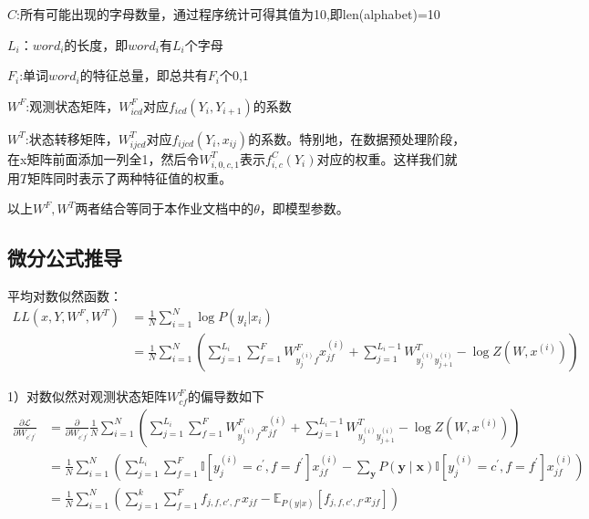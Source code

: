 \documentclass[a4paper,UTF8]{article}
\numberwithin{equation}{section}
\begin{document}
$C$:所有可能出现的字母数量，通过程序统计可得其值为10,即len(alphabet)=10

$L_{i}$：$word_{i}$的长度，即$word_{i}$有$L_i$个字母

$F_i$:单词$word_i$的特征总量，即总共有$F_i$个0,1

$W^F$:观测状态矩阵，$W^F_{icd}$对应$f_{icd}(Y_i,Y_{i+1})$的系数

$W^T$:状态转移矩阵，$W^T_{ijcd}$对应$f_{ijcd}(Y_i,x_{ij})$的系数。特别地，在数据预处理阶段，在x矩阵前面添加一列全1，然后令$W^T_{i,0,c,1}$表示$f^C_{i,c}(Y_i)$对应的权重。这样我们就用$T$矩阵同时表示了两种特征值的权重。

以上$W^F,W^T$两者结合等同于本作业文档中的$\theta$，即模型参数。

\subsection{微分公式推导}
平均对数似然函数：
$$
\begin{aligned}
LL(x,Y,W^F,W^T)&=\frac 1 N \sum\limits_{i=1}^N \log P(y_i|x_i)\\
&=\frac{1}{N} \sum_{i=1}^{N}\left(\sum_{j=1}^{L_{i}} \sum_{f=1}^{F} W_{y_{j}^{(i)} f}^{F} x_{j f}^{(i)}+\sum_{j=1}^{L_{i}-1} W_{y_{j}^{(i)} y_{j+1}^{(i)}}^{T}-\log Z\left(W, x^{(i)}\right)\right)
\end{aligned}
$$

1）对数似然对观测状态矩阵$W_{cf}^{F}$的偏导数如下
$$
\begin{aligned}
\frac{\partial \mathcal{L}}{\partial W_{c^{\prime} f^{\prime}}}
&=\frac{\partial}{\partial W_{c^{\prime} f^{\prime}}} \frac{1}{N} \sum_{i=1}^{N}\left(\sum_{j=1}^{L_{i}} \sum_{f=1}^{F} W_{y_{j}^{(i)} f}^{F} x_{j f}^{(i)}+\sum_{j=1}^{L_{i}-1} W_{y_{j}^{(i)} y_{j+1}^{(i)}}^{T}-\log Z\left(W, x^{(i)}\right)\right)\\
&=\frac{1}{N} \sum_{i=1}^{N}\left(\sum_{j=1}^{L_{i}} \sum_{f=1}^{F} \mathbb{I}\left[y_{j}^{(i)}=c^{\prime}, f=f^{\prime}\right] x_{j f}^{(i)}-\sum_{\mathbf{y}} P(\mathbf{y} \mid \mathbf{x}) \mathbb{I}\left[y_{j}^{(i)}=c^{\prime}, f=f^{\prime}\right] x_{j f}^{(i)}\right) \\
&=\frac{1}{N} \sum_{i=1}^{N}\left( \sum_{j=1}^{k}\sum_{f=1}^{F}f_{j,f,c',f'}x_{jf} - \mathbb{E}_{P(y|x)} \left[ f_{j,f,c',f'}x_{jf} \right] \right)
\end{aligned}
$$
\end{document}
